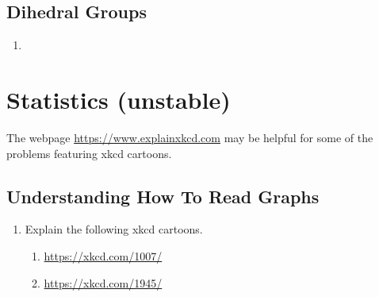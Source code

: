 \documentclass[11pt, letterpaper]{article}
\begin{document}
\subsection{Dihedral Groups}
\begin{enumerate}
	\item 
\end{enumerate}

\newpage

\section{Statistics (unstable) }
The webpage \url{https://www.explainxkcd.com} may be helpful for some of the problems featuring xkcd cartoons.
\subsection{Understanding How To Read Graphs}

\begin{enumerate}
	\item Explain the following xkcd cartoons.
	\begin{enumerate}
		\item \url{https://xkcd.com/1007/}
		\item \url{https://xkcd.com/1945/}
	\end{enumerate}
\end{enumerate}
\end{document}

